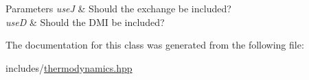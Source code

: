 \begin{DoxyParams}{Parameters}
{\em useJ} & Should the exchange be included? \\
\hline
{\em useD} & Should the D\+MI be included? \\
\hline
\end{DoxyParams}


The documentation for this class was generated from the following file\+:\begin{DoxyCompactItemize}
\item 
includes/\hyperlink{thermodynamics_8hpp}{thermodynamics.\+hpp}\end{DoxyCompactItemize}
